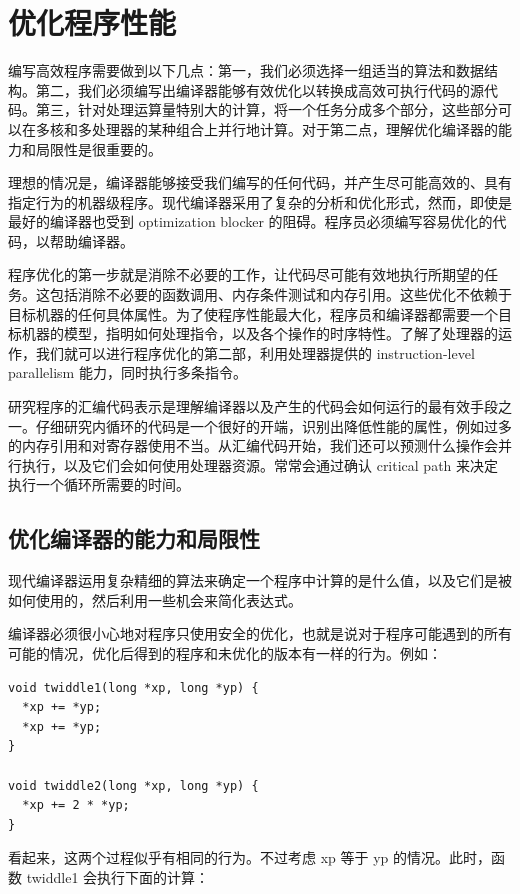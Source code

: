 \chapter{优化程序性能}

编写高效程序需要做到以下几点：第一，我们必须选择一组适当的算法和数据结构。第二，我们必须编写出编译器能够有效优化以转换成高效可执行代码的源代码。第三，针对处理运算量特别大的计算，将一个任务分成多个部分，这些部分可以在多核和多处理器的某种组合上并行地计算。对于第二点，理解优化编译器的能力和局限性是很重要的。

理想的情况是，编译器能够接受我们编写的任何代码，并产生尽可能高效的、具有指定行为的机器级程序。现代编译器采用了复杂的分析和优化形式，然而，即使是最好的编译器也受到 optimization blocker 的阻碍。程序员必须编写容易优化的代码，以帮助编译器。

程序优化的第一步就是消除不必要的工作，让代码尽可能有效地执行所期望的任务。这包括消除不必要的函数调用、内存条件测试和内存引用。这些优化不依赖于目标机器的任何具体属性。为了使程序性能最大化，程序员和编译器都需要一个目标机器的模型，指明如何处理指令，以及各个操作的时序特性。了解了处理器的运作，我们就可以进行程序优化的第二部，利用处理器提供的 instruction-level parallelism 能力，同时执行多条指令。

研究程序的汇编代码表示是理解编译器以及产生的代码会如何运行的最有效手段之一。仔细研究内循环的代码是一个很好的开端，识别出降低性能的属性，例如过多的内存引用和对寄存器使用不当。从汇编代码开始，我们还可以预测什么操作会并行执行，以及它们会如何使用处理器资源。常常会通过确认 critical path 来决定执行一个循环所需要的时间。

\section{优化编译器的能力和局限性}

现代编译器运用复杂精细的算法来确定一个程序中计算的是什么值，以及它们是被如何使用的，然后利用一些机会来简化表达式。

编译器必须很小心地对程序只使用安全的优化，也就是说对于程序可能遇到的所有可能的情况，优化后得到的程序和未优化的版本有一样的行为。例如：

\begin{verbatim}
void twiddle1(long *xp, long *yp) {
  *xp += *yp;
  *xp += *yp;
}

void twiddle2(long *xp, long *yp) {
  *xp += 2 * *yp;
}
\end{verbatim}

看起来，这两个过程似乎有相同的行为。不过考虑 xp 等于 yp 的情况。此时，函数 twiddle1 会执行下面的计算：

